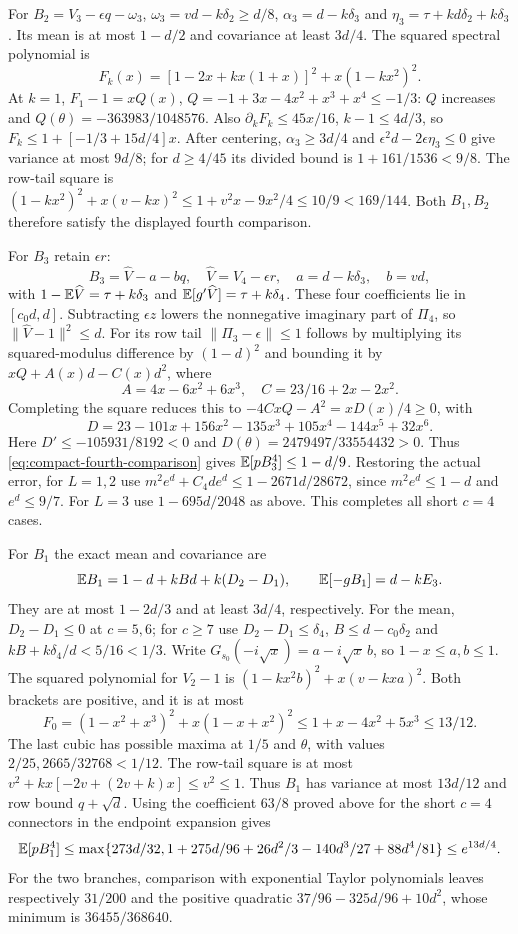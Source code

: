 For $B_2=V_3-\epsilon q-\omega_3$,
$\omega_3=vd-k\delta_{2}\ge d/8$, $\alpha_3=d-k\delta_{3}$ and
$\eta_3=\tau+kd\delta_{2}+k\delta_{3}$.
Its mean is at most $1-d/2$ and covariance at least $3d/4$.
The squared spectral polynomial is
\[
 F_k(x)=[1-2x+kx(1+x)]^2+x(1-kx^2)^2.
\]
At $k=1$, $F_1-1=xQ(x)$,
$Q=-1+3x-4x^2+x^3+x^4\le-1/3$:
$Q$ increases and $Q(\theta)=-363983/1048576$.
Also $\partial_kF_k\le45x/16$, $k-1\le4d/3$, so
$F_k\le1+[-1/3+15d/4]x$.
After centering, $\alpha_3\ge3d/4$ and
$\epsilon^2d-2\epsilon\eta_3\le0$ give variance at most $9d/8$;
for $d\ge4/45$ its divided bound is $1+161/1536<9/8$.
The row-tail square is
$(1-kx^2)^2+x(v-kx)^2\le1+v^2x-9x^2/4\le10/9<169/144$.
Both $B_1,B_2$ therefore satisfy the displayed fourth comparison.

For $B_3$ retain $\epsilon r$:
\[
 B_3=\widehat V-a-bq,\quad\widehat V=V_4-\epsilon r,\quad
 a=d-k\delta_{3},\quad b=vd,
\]
with $1-\mathbb E\widehat V=\tau+k\delta_{3}$ and
$\mathbb E[g'\widehat V]=\tau+k\delta_{4}$.
These four coefficients lie in $[c_0d,d]$.
Subtracting $\epsilon z$ lowers the nonnegative imaginary part of $\Pi_4$,
so $\|\widehat V-1\|^2\le d$.
For its row tail $\|\Pi_3-\epsilon\|\le1$ follows by multiplying its
squared-modulus difference by $(1-d)^2$ and bounding it by
$xQ+A(x)d-C(x)d^2$, where
\[
 A=4x-6x^2+6x^3,\quad C=23/16+2x-2x^2.
\]
Completing the square reduces this to
$-4CxQ-A^2=xD(x)/4\ge0$, with
\[
 D=23-101x+156x^2-135x^3+105x^4-144x^5+32x^6.
\]
Here $D'\le-105931/8192<0$ and
$D(\theta)=2479497/33554432>0$.
Thus \eqref{eq:compact-fourth-comparison} gives $\mathbb E[pB_3^4]\le1-d/9$.
Restoring the actual error, for $L=1,2$ use
$m^2e^d+C_4de^d\le1-2671d/28672$,
since $m^2e^d\le1-d$ and $e^d\le9/7$.
For $L=3$ use $1-695d/2048$ as above. This completes all short $c=4$ cases.

For $B_1$ the exact mean and covariance are
\[
 \mathbb E B_1=1-d+kBd+k(D_2-D_1),\qquad\mathbb E[-gB_1]=d-kE_3.
\]
They are at most $1-2d/3$ and at least $3d/4$, respectively.
For the mean, $D_2-D_1\le0$ at $c=5,6$; for $c\ge7$ use
$D_2-D_1\le \delta_{4}$, $B\le d-c_0\delta_{2}$ and
$kB+k\delta_{4}/d<5/16<1/3$.
Write $G_{s_0}(-i\sqrt x)=a-i\sqrt x\,b$, so $1-x\le a,b\le1$.
The squared polynomial for $V_2-1$ is
$(1-kx^2b)^2+x(v-kxa)^2$.
Both brackets are positive, and it is at most
\[
 F_0=(1-x^2+x^3)^2+x(1-x+x^2)^2
 \le1+x-4x^2+5x^3\le13/12.
\]
The last cubic has possible maxima at $1/5$ and $\theta$, with values
$2/25,2665/32768<1/12$.
The row-tail square is at most
$v^2+kx[-2v+(2v+k)x]\le v^2\le1$.
Thus $B_1$ has variance at most $13d/12$ and row bound $q+\sqrt d$.
Using the coefficient $63/8$ proved above for the short $c=4$ connectors in the endpoint expansion gives
\[
 \mathbb E[pB_1^4]\le\max\{273d/32,
 1+275d/96+26d^2/3-140d^3/27+88d^4/81\}\le e^{13d/4}.
\]
For the two branches, comparison with exponential Taylor polynomials
leaves respectively $31/200$ and the positive quadratic
$37/96-325d/96+10d^2$, whose minimum is $36455/368640$.

